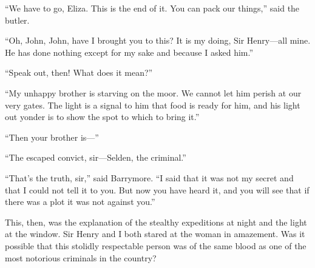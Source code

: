 \documentclass[paper=5.5in:8.5in,BCOR=7mm,twoside,DIV=calc,12pt,usegeometry,openany,chapterprefix,endperiod]{scrbook} %
\begin{document}
\enquote{We have to go, Eliza. This is the end of it. You can pack our things,} said the butler.

\enquote{Oh, John, John, have I brought you to this? It is my doing, Sir Henry\nobreakdash---all mine. He has done nothing except for my sake and because I asked him.}

\enquote{Speak out, then! What does it mean?}

\enquote{My unhappy brother is starving on the moor. We cannot let him perish at our very gates. The light is a signal to him that food is ready for him, and his light out yonder is to show the spot to which to bring it.}

\enquote{Then your brother is\nobreakdash---}

\enquote{The escaped convict, sir\nobreakdash---Selden, the criminal.}

\enquote{That's the truth, sir,} said Barrymore. \enquote{I said that it was not my secret and that I could not tell it to you. But now you have heard it, and you will see that if there was a plot it was not against you.}
%


This, then, was the explanation of the stealthy expeditions at night and the light at the window. Sir Henry and I both stared at the woman in amazement. Was it possible that this stolidly respectable person was of the same blood as one of the most notorious criminals in the country?
\end{document}

